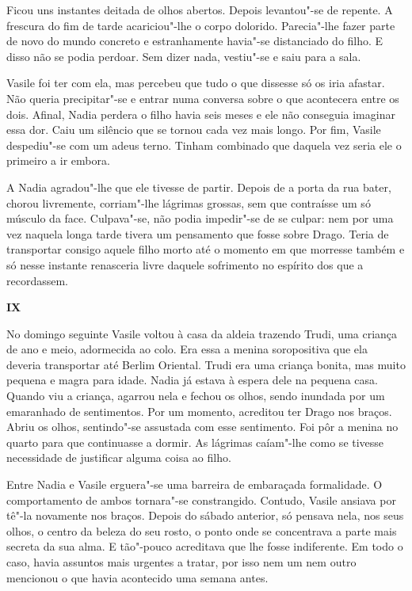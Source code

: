 Ficou uns instantes deitada de olhos abertos. Depois levantou"-se de
repente. A frescura do fim de tarde acariciou"-lhe o corpo dolorido.
Parecia"-lhe fazer parte de novo do mundo concreto e estranhamente
havia"-se distanciado do filho. E disso não se podia perdoar. Sem dizer
nada, vestiu"-se e saiu para a sala.

Vasile foi ter com ela, mas percebeu que tudo o que dissesse só os iria
afastar. Não queria precipitar"-se e entrar numa conversa sobre o que
acontecera entre os dois. Afinal, Nadia perdera o filho havia seis
meses e ele não conseguia imaginar essa dor. Caiu um silêncio que se
tornou cada vez mais longo. Por fim, Vasile despediu"-se com um adeus
terno. Tinham combinado que daquela vez seria ele o primeiro a ir
embora.

A Nadia agradou"-lhe que ele tivesse de partir. Depois de a porta da rua
bater, chorou livremente, corriam"-lhe lágrimas grossas, sem que
contraísse um só músculo da face. Culpava"-se, não podia impedir"-se de se
culpar: nem por uma vez naquela longa tarde tivera um pensamento que
fosse sobre Drago. Teria de transportar consigo aquele filho morto até
o momento em que morresse também e só nesse instante renasceria livre
daquele sofrimento no espírito dos que a recordassem.


\pagebreak
\movetooddpage
\vspace*{1.8cm}
\noindent{}\textbf{IX}

\bigskip

\noindent{}No domingo seguinte Vasile voltou à casa da aldeia trazendo Trudi, uma
criança de ano e meio, adormecida ao colo. Era essa a menina
soropositiva que ela deveria transportar até Berlim Oriental. Trudi
era uma criança bonita, mas muito pequena e magra para idade. Nadia já
estava à espera dele na pequena casa. Quando viu a criança, agarrou
nela e fechou os olhos, sendo inundada por um emaranhado de
sentimentos. Por um momento, acreditou ter Drago nos braços. Abriu os
olhos, sentindo"-se assustada com esse sentimento. Foi pôr a menina no
quarto para que continuasse a dormir. As lágrimas caíam"-lhe como se
tivesse necessidade de justificar alguma coisa ao filho.

Entre Nadia e Vasile erguera"-se uma barreira de embaraçada
formalidade. O comportamento de ambos tornara"-se constrangido. Contudo, Vasile ansiava por tê"-la novamente nos
braços. Depois do sábado anterior, só pensava nela, nos seus olhos, o
centro da beleza do seu rosto, o ponto onde se concentrava a parte mais
secreta da sua alma. E tão"-pouco acreditava que lhe fosse indiferente.
Em todo o caso, havia assuntos mais urgentes a tratar, por isso
nem um nem outro mencionou o que havia acontecido uma semana antes.


